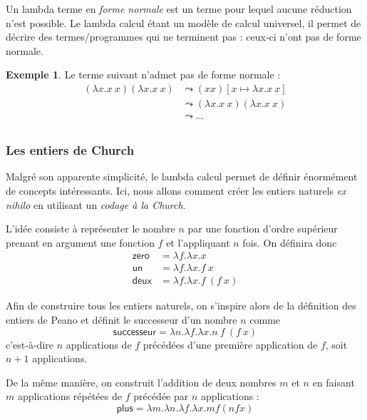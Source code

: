 \documentclass{article}
\theoremstyle{definition}
\newtheorem{example}{Exemple}
\theoremstyle{remark}
\begin{document}
Un lambda terme en \emph{forme normale} est un terme pour lequel
aucune réduction n'est possible. Le lambda calcul étant un modèle de
calcul universel, il permet de décrire des termes/programmes qui ne
terminent pas : ceux-ci n'ont pas de forme normale.

\begin{example}
 
  Le terme suivant n'admet pas de forme normale :
  \begin{align*}
  (\lambda x. x\: x) (\lambda x. x\: x) &\leadsto (x x)[x \mapsto \lambda x. x\: x] \\
                                        &\leadsto (\lambda x. x\: x) (\lambda x. x\: x) \\
                                        &\leadsto \ldots \\
  \end{align*}
\end{example}

\subsubsection{Les entiers de Church}

Malgré son apparente simplicité, le lambda calcul permet de définir
énormément de concepts intéressants. Ici, nous allons comment créer
les entiers naturels \textit{ex nihilo} en utilisant un \emph{codage à
  la Church}.

L'idée consiste à représenter le nombre \(n\) par une fonction d'ordre
supérieur prenant en argument une fonction \(f\) et l'appliquant \(n\)
fois. On définira donc 
%
\begin{align*}
\mathsf{zero} &= \lambda f. \lambda x. x \\
\mathsf{un}   &= \lambda f. \lambda x. f\: x \\
\mathsf{deux} &= \lambda f. \lambda x. f\: (f\: x)
\end{align*}

Afin de construire tous les entiers naturels, on s'inspire alors de la
définition des entiers de Peano et définit le successeur d'un nombre \(n\)
comme
%
\[
\mathsf{successeur} = \lambda n. \lambda f. \lambda x. n\: f\: (f\: x)
\]
%
c'est-à-dire \(n\) applications de \(f\) précédées d'une première
application de \(f\), soit \(n+1\) applications.

De la même manière, on construit l'addition de deux nombres \(m\) et
\(n\) en faisant \(m\) applications répétées de \(f\) précédée par
\(n\) applications :
%
\[
\mathsf{plus} = \lambda m. \lambda n. \lambda f. \lambda x. m f (n f x)
\]
\end{document}
